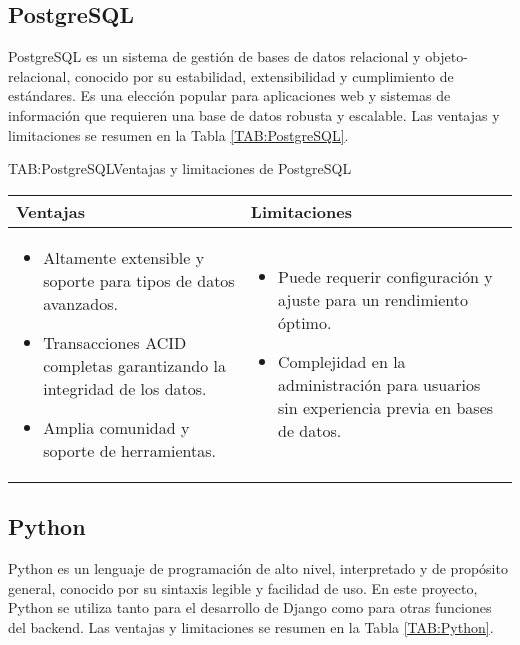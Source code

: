 \subsection{PostgreSQL}

PostgreSQL es un sistema de gestión de bases de datos relacional y objeto-relacional, conocido por su estabilidad, extensibilidad y cumplimiento de estándares. Es una elección popular para aplicaciones web y sistemas de información que requieren una base de datos robusta y escalable. Las ventajas y limitaciones se resumen en la Tabla \ref{TAB:PostgreSQL}.

\begin{table}[PostgreSQL]{TAB:PostgreSQL}{Ventajas y limitaciones de PostgreSQL}
  \begin{tabular}{|p{7cm}|p{7cm}|}
    \hline
    \textbf{Ventajas} & \textbf{Limitaciones} \\
    \hline
    \begin{itemize}
      \item Altamente extensible y soporte para tipos de datos avanzados.
      \item Transacciones ACID completas garantizando la integridad de los datos.
      \item Amplia comunidad y soporte de herramientas.
    \end{itemize} &
    \begin{itemize}
      \item Puede requerir configuración y ajuste para un rendimiento óptimo.
      \item Complejidad en la administración para usuarios sin experiencia previa en bases de datos.
    \end{itemize} \\
    \hline
  \end{tabular}
\end{table}

\subsection{Python}

Python es un lenguaje de programación de alto nivel, interpretado y de propósito general, conocido por su sintaxis legible y facilidad de uso. En este proyecto, Python se utiliza tanto para el desarrollo de Django como para otras funciones del backend. Las ventajas y limitaciones se resumen en la Tabla \ref{TAB:Python}.

